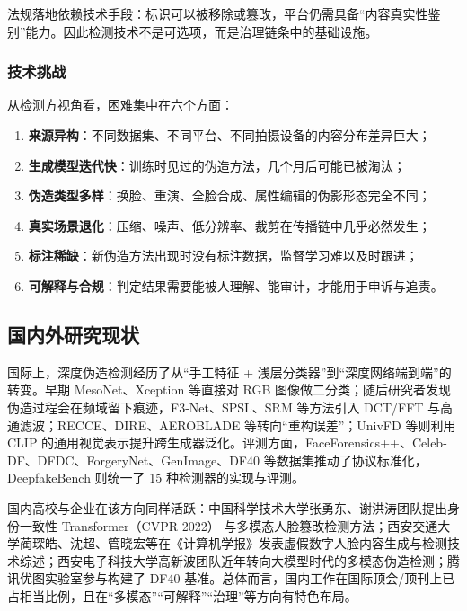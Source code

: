 法规落地依赖技术手段：标识可以被移除或篡改，平台仍需具备“内容真实性鉴别”能力。因此检测技术不是可选项，而是治理链条中的基础设施。

\subsubsection{技术挑战}

从检测方视角看，困难集中在六个方面：

\begin{enumerate}
  \item \textbf{来源异构}：不同数据集、不同平台、不同拍摄设备的内容分布差异巨大；
  \item \textbf{生成模型迭代快}：训练时见过的伪造方法，几个月后可能已被淘汰；
  \item \textbf{伪造类型多样}：换脸、重演、全脸合成、属性编辑的伪影形态完全不同；
  \item \textbf{真实场景退化}：压缩、噪声、低分辨率、裁剪在传播链中几乎必然发生；
  \item \textbf{标注稀缺}：新伪造方法出现时没有标注数据，监督学习难以及时跟进；
  \item \textbf{可解释与合规}：判定结果需要能被人理解、能审计，才能用于申诉与追责。
\end{enumerate}

\subsection{国内外研究现状}

国际上，深度伪造检测经历了从“手工特征 + 浅层分类器”到“深度网络端到端”的转变。早期 MesoNet\cite{afchar2018mesonet}、Xception\cite{rossler2019ffpp} 等直接对 RGB 图像做二分类；随后研究者发现伪造过程会在频域留下痕迹，F3-Net\cite{qian2020f3net}、SPSL\cite{liu2021spsl}、SRM\cite{luo2021srm} 等方法引入 DCT/FFT 与高通滤波；RECCE\cite{cao2022recce}、DIRE\cite{wang2023dire}、AEROBLADE\cite{ricker2024aeroblade} 等转向“重构误差”；UnivFD\cite{ojha2023univfd} 等则利用 CLIP 的通用视觉表示提升跨生成器泛化。评测方面，FaceForensics++、Celeb-DF、DFDC、ForgeryNet、GenImage、DF40 等数据集推动了协议标准化，DeepfakeBench\cite{yan2023deepfakebench} 则统一了 15 种检测器的实现与评测。

国内高校与企业在该方向同样活跃：中国科学技术大学张勇东、谢洪涛团队提出身份一致性 Transformer（CVPR 2022）\cite{dong2022ict} 与多模态人脸篡改检测方法；西安交通大学蔺琛皓、沈超、管晓宏等在《计算机学报》发表虚假数字人脸内容生成与检测技术综述\cite{lin2023survey}；西安电子科技大学高新波团队近年转向大模型时代的多模态伪造检测；腾讯优图实验室参与构建了 DF40 基准。总体而言，国内工作在国际顶会/顶刊上已占相当比例，且在“多模态”“可解释”“治理”等方向有特色布局。

